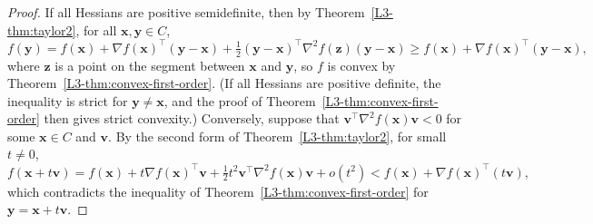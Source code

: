 \begin{proof}
    If all Hessians are positive semidefinite, then by Theorem~\ref{L3-thm:taylor2}, for all $\mathbf{x}, \mathbf{y} \in C$,
    \[f(\mathbf{y}) = f(\mathbf{x}) + \nabla f(\mathbf{x})^\top(\mathbf{y} - \mathbf{x}) + \tfrac{1}{2}(\mathbf{y} - \mathbf{x})^\top\nabla^2 f(\mathbf{z})(\mathbf{y} - \mathbf{x}) \geq f(\mathbf{x}) + \nabla f(\mathbf{x})^\top(\mathbf{y} - \mathbf{x}),\]
    where $\mathbf{z}$ is a point on the segment between $\mathbf{x}$ and $\mathbf{y}$, so $f$ is convex by Theorem~\ref{L3-thm:convex-first-order}. (If all Hessians are positive definite, the inequality is strict for $\mathbf{y} \neq \mathbf{x}$, and the proof of Theorem~\ref{L3-thm:convex-first-order} then gives strict convexity.) Conversely, suppose that $\mathbf{v}^\top\nabla^2 f(\mathbf{x})\mathbf{v} < 0$ for some $\mathbf{x} \in C$ and $\mathbf{v}$. By the second form of Theorem~\ref{L3-thm:taylor2}, for small $t \neq 0$,
    \[f(\mathbf{x} + t\mathbf{v}) = f(\mathbf{x}) + t\nabla f(\mathbf{x})^\top\mathbf{v} + \tfrac{1}{2}t^2\mathbf{v}^\top\nabla^2 f(\mathbf{x})\mathbf{v} + o(t^2) < f(\mathbf{x}) + \nabla f(\mathbf{x})^\top(t\mathbf{v}),\]
    which contradicts the inequality of Theorem~\ref{L3-thm:convex-first-order} for $\mathbf{y} = \mathbf{x} + t\mathbf{v}$.
\end{proof}

